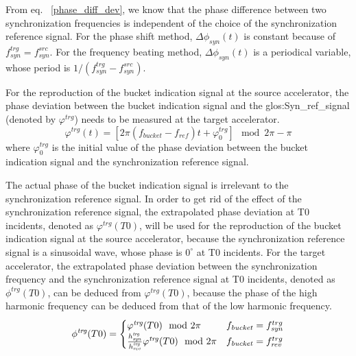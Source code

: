 From eq. ~\ref{phase_diff_dev}, we know that the phase difference between two synchronization frequencies is independent of the choice of the synchronization reference signal. For the phase shift method, $\Delta \phi_\mathit{syn}(t)$ is constant because of $f_\mathit{syn}^{trg}=f_\mathit{syn}^{src}$. For the frequency beating method, $\Delta \phi_\mathit{syn}(t)$ is a periodical variable, whose period is $1/(f_\mathit{syn}^{trg}-f_\mathit{syn}^{src})$. 

For the reproduction of the bucket indication signal at the source accelerator, the phase deviation between the bucket indication signal and the \gls{glos:Syn_ref_signal} (denoted by $\varphi^\mathit{trg}$) needs to be measured at the target accelerator.
\begin{equation}
\varphi^\mathit{trg}(t)= [2\pi(f_\mathit{bucket}-f_\mathit{ref})t+\varphi^\mathit{trg}_0] \mod 2\pi - \pi
\end{equation}
where $\varphi^\mathit{trg}_0$ is the initial value of the phase deviation between the bucket indication signal and the synchronization reference signal.

The actual phase of the bucket indication signal is irrelevant to the synchronization reference signal. In order to get rid of the effect of the synchronization reference signal, the extrapolated phase deviation at T0 incidents, denoted as $\varphi^\mathit{trg}({T0})$, will be used for the reproduction of the bucket indication signal at the source accelerator, because the synchronization reference signal is a sinusoidal wave, whose phase is $0^\circ$ at T0 incidents. For the target accelerator, the extrapolated phase deviation between the synchronization frequency and the synchronization reference signal at T0 incidents, denoted as $\phi^\mathit{trg}({T0})$, can be deduced from $\varphi^\mathit{trg}({T0})$, because the phase of the high harmonic frequency can be deduced from that of the low harmonic frequency.
\begin{eqnarray}
\phi^\mathit{trg}({T0})=
\begin{cases}
\varphi^\mathit{trg}({T0}) \mod 2\pi &f_{\mathit{bucket}}=f_{\mathit{syn}}^{trg}\cr

\frac{h_\mathit{syn}^\mathit{trg}}{h_\mathit{rev}^\mathit{trg}}\varphi^\mathit{trg}({T0}) \mod 2\pi &f_{\mathit{bucket}}=f_{\mathit{rev}}^{trg}
\label{relation}
\end{cases}
\end{eqnarray}

